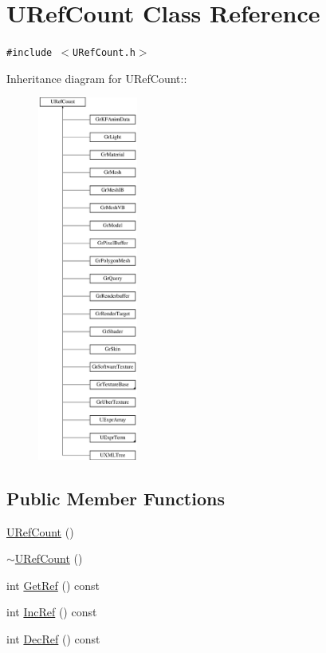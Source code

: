\hypertarget{class_u_ref_count}{
\section{URefCount Class Reference}
\label{class_u_ref_count}
}
{\tt \#include $<$URefCount.h$>$}

Inheritance diagram for URefCount::\begin{figure}[H]
\begin{center}
\leavevmode
\includegraphics[height=12cm]{class_u_ref_count}
\end{center}
\end{figure}
\subsection*{Public Member Functions}
\begin{CompactItemize}
\item 
\hyperlink{class_u_ref_count_5af4273c0844affa228bfdcf8e3ca554}{URefCount} ()
\item 
\hyperlink{class_u_ref_count_2d62e46289b66ca9449d5e2cd6917991}{$\sim$URefCount} ()
\item 
int \hyperlink{class_u_ref_count_14478a3b8179a33ea50f3db7c70b502c}{GetRef} () const 
\item 
int \hyperlink{class_u_ref_count_57a30bf0235023f3c1ac4cab85d58fcf}{IncRef} () const 
\item 
int \hyperlink{class_u_ref_count_81598a750fb88c7ed7870f9b9e052c21}{DecRef} () const 
\end{CompactItemize}


